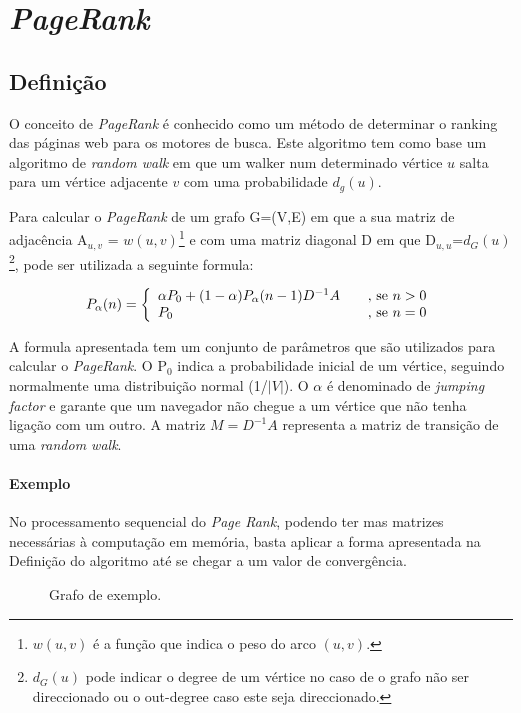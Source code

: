 \documentclass[a4paper,10pt]{report}
\begin{document}
\section{\textit{PageRank}}

  \subsection{Definição}
  \label{sec:dpr}

  O conceito de \textit{PageRank} é conhecido como um método de determinar o ranking das páginas web para os motores de busca. 
  Este algoritmo tem como base um algoritmo de \textit{random walk} em que um walker num determinado vértice $u$ salta para um vértice adjacente $v$ com uma probabilidade $d_g(u)$.
  
  Para calcular o \textit{PageRank} de um grafo G=(V,E) em que a sua matriz de adjacência A$_{u,v}$ = $w(u,v)$\footnote{$w(u,v)$ é a função que indica o peso do arco $(u,v)$.} e com uma matriz diagonal D em que D$_{u,u}$=$d_G(u)$\footnote{$d_G(u)$ pode indicar o degree de um vértice no caso de o grafo não ser direccionado ou o out-degree caso este seja direccionado.}, pode ser utilizada a seguinte formula:
  
\[ P_\alpha(n) = \left\{
  \begin{array}{l l}
    \alpha P_0+(1-\alpha)P_\alpha(n-1)D^{{-}1}A & \quad \text{, se } n>0   \\
    P_0 & \quad \text{, se }n=0 
  \end{array} \right.\]
  
  A formula apresentada tem um conjunto de parâmetros que são utilizados para calcular o \textit{PageRank}. O P$_0$ indica a probabilidade inicial de um vértice, seguindo normalmente uma distribuição normal (1/$|V|$). O $\alpha$ é denominado de \textit{jumping factor} e garante que um navegador não chegue a um vértice que não tenha ligação com um outro. A matriz $M=D^{{-}1}A$ representa a matriz de transição de uma \textit{random walk}.
  
  \paragraph{Exemplo}  
  No processamento sequencial do \textit{Page Rank}, podendo ter mas matrizes necessárias à computação em memória, basta aplicar a forma apresentada na Definição do algoritmo até se chegar a um valor de convergência.
   
  \begin{figure}[h]
    \centering
    \caption{Grafo de exemplo.}
    \label{graph}
  \end{figure}
\end{document}

